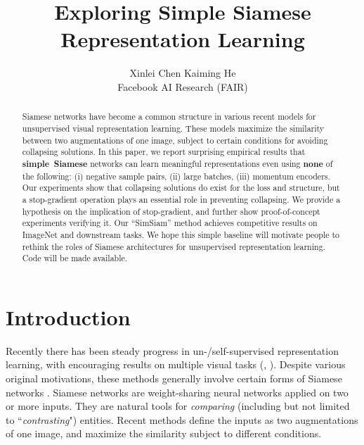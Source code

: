 \documentclass[final]{cvpr}
\begin{document}
\title{\vspace{-1.em} Exploring Simple Siamese Representation Learning \vspace{-.5em}}

\author{
Xinlei Chen \qquad Kaiming He \vspace{.5em} \\
Facebook AI Research (FAIR)
\vspace{1.em}  }

\maketitle

\begin{abstract}
\vspace{-.5em}
Siamese networks have become a common structure in various recent models for unsupervised visual representation learning.
These models maximize the similarity between two augmentations of one image, subject to certain conditions for avoiding collapsing solutions. In this paper, we report surprising empirical results that \mbox{\textbf{simple Siamese}} networks can learn meaningful representations even using \textbf{none} of the following: (i) negative sample pairs, (ii) large batches, (iii) momentum encoders. Our experiments show that collapsing solutions do exist for the loss and structure, but a stop-gradient operation plays an essential role in preventing collapsing.
We provide a hypothesis on the implication of stop-gradient, and further show proof-of-concept experiments verifying it.
Our ``SimSiam'' method achieves competitive results on ImageNet and downstream tasks. 
We hope this simple baseline will motivate people to rethink the roles of Siamese architectures for unsupervised representation learning. Code will be made available.
\vspace{-.5em}
\end{abstract}

\section{Introduction\label{sec:intro}}

Recently there has been steady progress in un-/self-supervised representation learning, with encouraging results on multiple visual tasks (\eg, \cite{Bachman2019,He2019a,Chen2020,Grill2020,Caron2020}). Despite various original motivations, these methods generally involve certain forms of Siamese networks \cite{Bromley1994}. Siamese networks are weight-sharing neural networks applied on two or more inputs. They are natural tools for \emph{comparing} (including but not limited to ``\emph{contrasting}") entities. Recent methods define the inputs as two augmentations of one image, and maximize the similarity subject to different conditions.
\end{document}
